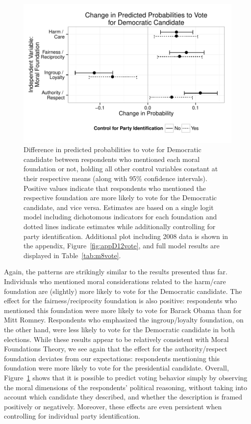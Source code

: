 \documentclass[12pt]{article}
\begin{document}
\begin{figure}[h]\centering
\includegraphics[scale=.9]{../calc/fig/fig8vote.pdf}
\caption{Difference in predicted probabilities to vote for Democratic candidate between respondents who mentioned each moral foundation or not, holding all other control variables constant at their respective means (along with 95\% confidence intervals). Positive values indicate that respondents who mentioned the respective foundation are more likely to vote for the Democratic candidate, and vice versa. Estimates are based on a single logit model including dichotomous indicators for each foundation and dotted lines indicate estimates while additionally controlling for party identification. Additional plot including 2008 data is shown in the appendix, Figure~\ref{fig:appD12vote}, and full model results are displayed in Table~\ref{tab:m8vote}.}\label{fig:8vote}
\end{figure}

Again, the patterns are strikingly similar to the results presented thus far. Individuals who mentioned moral considerations related to the harm/care foundation are (slightly) more likely to vote for the Democratic candidate. The effect for the fairness/reciprocity foundation is also positive: respondents who mentioned this foundation were more likely to vote for Barack Obama than for Mitt Romney. Respondents who emphasized the ingroup/loyalty foundation, on the other hand, were less likely to vote for the Democratic candidate in both elections. While these results appear to be relatively consistent with Moral Foundations Theory, we see again that the effect for the authority/respect foundation deviates from our expectations: respondents mentioning this foundation were more likely to vote for the presidential candidate. Overall, Figure~\ref{fig:8vote} shows that it is possible to predict voting behavior simply by observing the moral dimensions of the respondents' political reasoning, without taking into account which candidate they described, and whether the description is framed positively or negatively. Moreover, these effects are even persistent when controlling for individual party identification.
\end{document}
